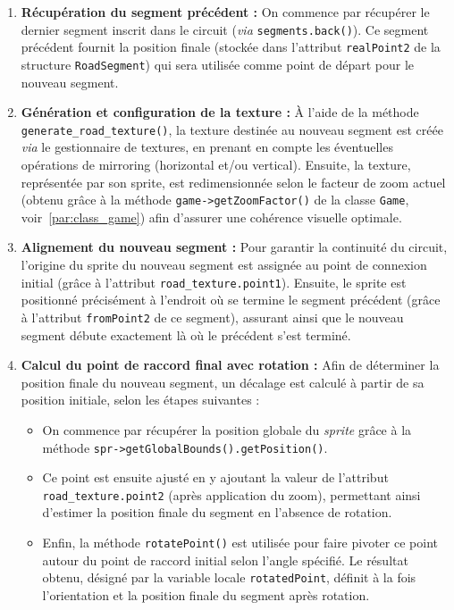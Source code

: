 \begin{enumerate}
    \item \textbf{Récupération du segment précédent :} %
    On commence par récupérer le dernier segment inscrit dans le circuit (\textit{via} \texttt{segments.back()}).
    Ce segment précédent fournit la position finale (stockée dans l'attribut \texttt{realPoint2} de la structure \texttt{RoadSegment}) qui sera utilisée comme point de départ pour le nouveau segment.

    \item \textbf{Génération et configuration de la texture :}
    À l'aide de la méthode \\\texttt{generate\_road\_texture()}, la texture destinée au nouveau segment est créée \textit{via} le gestionnaire de textures, en prenant en compte les éventuelles opérations de mirroring (horizontal et/ou vertical).
    Ensuite, la texture, représentée par son \gls{sprite}, est redimensionnée selon le facteur de zoom actuel (obtenu grâce à la méthode \texttt{game->getZoomFactor()} de la classe \texttt{Game}, voir~\ref{par:class_game}) afin d'assurer une cohérence visuelle optimale.

    \item \textbf{Alignement du nouveau segment :}
    Pour garantir la continuité du circuit, l'origine du \gls{sprite} du nouveau segment est assignée au point de connexion initial (grâce à l'attribut \texttt{road\_texture.point1}).
    Ensuite, le \gls{sprite} est positionné précisément à l'endroit où se termine le segment précédent (grâce à l'attribut \texttt{fromPoint2} de ce segment), assurant ainsi que le nouveau segment débute exactement là où le précédent s'est terminé.

    \item \textbf{Calcul du point de raccord final avec rotation :}
    Afin de déterminer la position finale du nouveau segment, un décalage est calculé à partir de sa position initiale, selon les étapes suivantes :
    \begin{itemize}
        \item On commence par récupérer la position globale du \textit{\gls{sprite}} grâce à la méthode \texttt{spr->getGlobalBounds().getPosition()}.
        \item Ce point est ensuite ajusté en y ajoutant la valeur de l'attribut \\\texttt{road\_texture.point2} (après application du zoom), permettant ainsi d'estimer la position finale du segment en l'absence de rotation.
        \item Enfin, la méthode \texttt{rotatePoint()} est utilisée pour faire pivoter ce point autour du point de raccord initial selon l'angle spécifié.
        Le résultat obtenu, désigné par la variable locale \texttt{rotatedPoint}, définit à la fois l'orientation et la position finale du segment après rotation.
    \end{itemize}


\end{enumerate}
